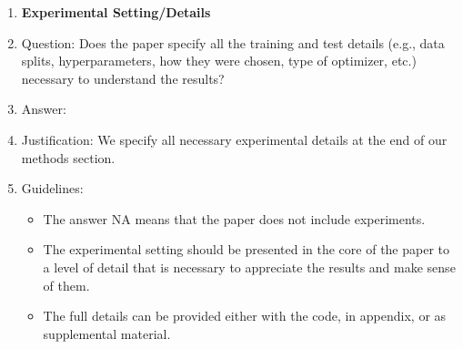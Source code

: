 \documentclass{article}
\begin{document}
\begin{enumerate}
\item {\bf Experimental Setting/Details}
    \item[] Question: Does the paper specify all the training and test details (e.g., data splits, hyperparameters, how they were chosen, type of optimizer, etc.) necessary to understand the results?
    \item[] Answer: \answerYes{} %
    \item[] Justification: We specify all necessary experimental details at the end of our methods section.
    \item[] Guidelines:
    \begin{itemize}
        \item The answer NA means that the paper does not include experiments.
        \item The experimental setting should be presented in the core of the paper to a level of detail that is necessary to appreciate the results and make sense of them.
        \item The full details can be provided either with the code, in appendix, or as supplemental material.
    \end{itemize}


\end{enumerate}
\end{document}
